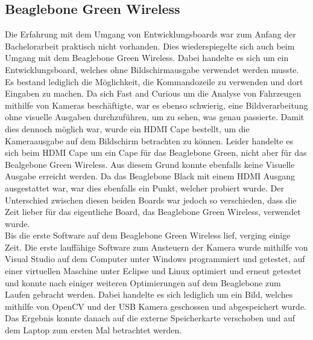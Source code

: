 \subsection{Beaglebone Green Wireless}
Die Erfahrung mit dem Umgang von Entwicklungsboards war zum Anfang der Bachelorarbeit praktisch nicht vorhanden. Dies wiederspiegelte sich auch beim Umgang mit dem Beaglebone Green Wireless. Dabei handelte es sich um ein Entwicklungsboard, welches ohne Bildschirmausgabe verwendet werden musste. Es bestand lediglich die Möglichkeit, die Kommandozeile zu verwenden und dort Eingaben zu machen. Da sich Fast and Curious um die Analyse von Fahrzeugen mithilfe von Kameras beschäftigte, war es ebenso schwierig, eine Bildverarbeitung ohne visuelle Ausgaben durchzuführen, um zu sehen, was genau passierte. Damit dies dennoch möglich war, wurde ein HDMI Cape bestellt, um die Kameraausgabe auf dem Bildschirm betrachten zu können. Leider handelte es sich beim HDMI Cape um ein Cape für das Beaglebone Green, nicht aber für das Bealgebone Green Wireless. Aus diesem Grund konnte ebenfalls keine Visuelle Ausgabe erreicht werden. Da das Beaglebone Black mit einem HDMI Ausgang ausgestattet war, war dies ebenfalls ein Punkt, welcher probiert wurde. Der Unterschied zwischen diesen beiden Boards war jedoch so verschieden, dass die Zeit lieber für das eigentliche Board, das Beaglebone Green Wireless, verwendet wurde.\\ 
Bis die erste Software auf dem Beaglebone Green Wireless lief, verging einige Zeit. Die erste lauffähige Software zum Ansteuern der Kamera wurde mithilfe von Visual Studio auf dem Computer unter Windows programmiert und getestet, auf einer virtuellen Maschine unter Eclipse und Linux optimiert und erneut getestet und konnte nach einiger weiteren Optimierungen auf dem Beaglebone zum Laufen gebracht werden. Dabei handelte es sich lediglich um ein Bild, welches mithilfe von OpenCV und der USB Kamera geschossen und abgespeichert wurde. Das Ergebnis konnte danach auf die externe Speicherkarte verschoben und auf dem Laptop zum ersten Mal betrachtet werden.